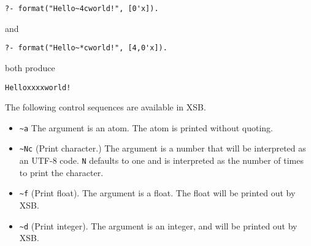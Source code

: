 \begin{description}
\begin{verbatim}
?- format("Hello~4cworld!", [0'x]).
\end{verbatim}

\noindent
and

\begin{verbatim}
?- format("Hello~*cworld!", [4,0'x]).
\end{verbatim}

\noindent
both produce

\begin{verbatim}
Helloxxxxworld!
\end{verbatim}

The following control sequences are available in XSB.


\begin{itemize}

\item \verb|~a|
The argument is an atom.  The atom is printed without quoting.  

\item \verb|~Nc|
(Print character.)  The argument is a number that will be interpreted as an
UTF-8 code. {\tt N} defaults to one and is interpreted as the number of
times to print the character.  

\item \verb|~f|
(Print float).  The argument is a float.  The float will be printed out by XSB.

\item \verb|~d|
(Print integer).  The argument is an integer, and will be printed out by XSB.

\end{itemize}
\end{description}
